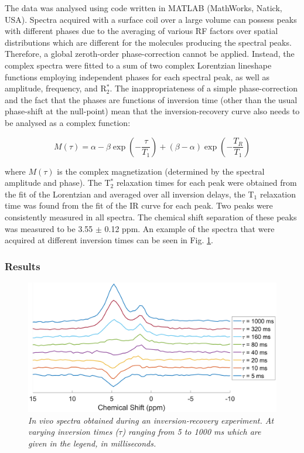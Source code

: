The data was analysed using code written in MATLAB (MathWorks, Natick, USA). Spectra acquired with a surface coil over a large volume can possess peaks with different phases due to the averaging of various \ac{RF} factors over spatial distributions which are different for the molecules producing the spectral peaks. Therefore, a global zeroth-order phase-correction cannot be applied. Instead, the complex spectra were fitted to a sum of two complex Lorentzian lineshape functions employing independent phases for each spectral peak, as well as amplitude, frequency, and R$_2^*$. The inappropriateness of a simple phase-correction and the fact that the phases are functions of inversion time (other than the usual phase-shift at the null-point) mean that the inversion-recovery curve also needs to be analysed as a complex function:

\begin{equation}
    M(\tau) = \alpha - \beta\exp(-\frac{\tau}{T_1}) + (\beta - \alpha)\exp(-\frac{T_R}{T_1})
    \label{eqn:Lip:IR}
\end{equation}

where $M(\tau)$ is the complex magnetization (determined by the spectral amplitude and phase). The T$_2^*$ relaxation times for each peak were obtained from the fit of the Lorentzian and averaged over all inversion delays, the T$_1$ relaxation time was found from the fit of the \ac{IR} curve for each peak. Two peaks were consistently measured in all spectra. The chemical shift separation of these peaks was measured to be 3.55 $\pm$ 0.12 ppm. An example of the spectra that were acquired at different inversion times can be seen in Fig. \ref{fig:Lip:IR}.

\subsubsection{Results}

\begin{figure}
    \centering
    \includegraphics[width=1\textwidth]{Figures/Lipid/NA_IR.png}
    \caption{\textit{\textit{In vivo} spectra obtained during an inversion-recovery experiment. At varying inversion times ($\tau$) ranging from 5 to 1000 ms which are given in the legend, in milliseconds.}}
    \label{fig:Lip:IR}
\end{figure}


